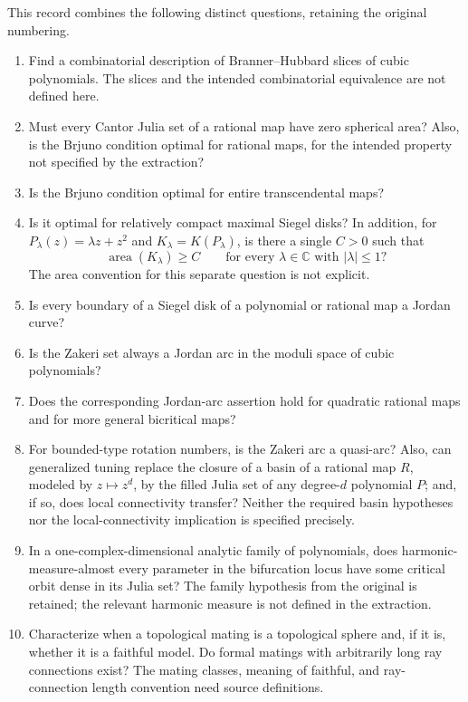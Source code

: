 \documentclass[11pt]{article}
\newcommand{\C}{\mathbb{C}}
\begin{document}
This record combines the following distinct questions, retaining the original numbering.
\begin{enumerate}
\item[6.] Find a combinatorial description of Branner--Hubbard slices of cubic polynomials. The slices and the intended combinatorial equivalence are not defined here.
\item[7.] Must every Cantor Julia set of a rational map have zero spherical area? Also, is the Brjuno condition optimal for rational maps, for the intended property not specified by the extraction?
\item[8.] Is the Brjuno condition optimal for entire transcendental maps?
\item[9.] Is it optimal for relatively compact maximal Siegel disks? In addition, for \(P_\lambda(z)=\lambda z+z^2\) and \(K_\lambda=K(P_\lambda)\), is there a single \(C>0\) such that
\[
\operatorname{area}(K_\lambda)\geq C\qquad\text{for every }\lambda\in\C\text{ with }|\lambda|\leq1?
\]
The area convention for this separate question is not explicit.
\item[10.] Is every boundary of a Siegel disk of a polynomial or rational map a Jordan curve?
\item[11.] Is the Zakeri set always a Jordan arc in the moduli space of cubic polynomials?
\item[12.] Does the corresponding Jordan-arc assertion hold for quadratic rational maps and for more general bicritical maps?
\item[13.] For bounded-type rotation numbers, is the Zakeri arc a quasi-arc? Also, can generalized tuning replace the closure of a basin of a rational map \(R\), modeled by \(z\mapsto z^d\), by the filled Julia set of any degree-\(d\) polynomial \(P\); and, if so, does local connectivity transfer? Neither the required basin hypotheses nor the local-connectivity implication is specified precisely.
\item[14.] In a one-complex-dimensional analytic family of polynomials, does harmonic-measure-almost every parameter in the bifurcation locus have some critical orbit dense in its Julia set? The family hypothesis from the original is retained; the relevant harmonic measure is not defined in the extraction.
\item[15.] Characterize when a topological mating is a topological sphere and, if it is, whether it is a faithful model. Do formal matings with arbitrarily long ray connections exist? The mating classes, meaning of faithful, and ray-connection length convention need source definitions.

\end{enumerate}
\end{document}
